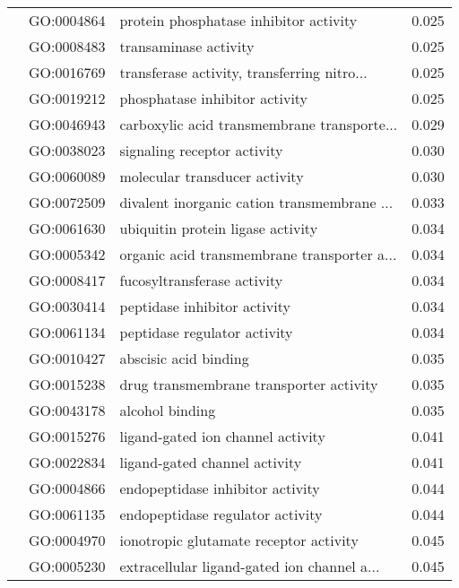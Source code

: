 \begin{longtable}{lllr}
   & GO:0004864 &       protein phosphatase inhibitor activity &         0.025 \\
   & GO:0008483 &                        transaminase activity &         0.025 \\
   & GO:0016769 &  transferase activity, transferring nitro... &         0.025 \\
   & GO:0019212 &               phosphatase inhibitor activity &         0.025 \\
   & GO:0046943 &  carboxylic acid transmembrane transporte... &         0.029 \\
   & GO:0038023 &                  signaling receptor activity &         0.030 \\
   & GO:0060089 &                molecular transducer activity &         0.030 \\
   & GO:0072509 &  divalent inorganic cation transmembrane ... &         0.033 \\
   & GO:0061630 &            ubiquitin protein ligase activity &         0.034 \\
   & GO:0005342 &  organic acid transmembrane transporter a... &         0.034 \\
   & GO:0008417 &                  fucosyltransferase activity &         0.034 \\
   & GO:0030414 &                 peptidase inhibitor activity &         0.034 \\
   & GO:0061134 &                 peptidase regulator activity &         0.034 \\
   & GO:0010427 &                        abscisic acid binding &         0.035 \\
   & GO:0015238 &      drug transmembrane transporter activity &         0.035 \\
   & GO:0043178 &                              alcohol binding &         0.035 \\
   & GO:0015276 &            ligand-gated ion channel activity &         0.041 \\
   & GO:0022834 &                ligand-gated channel activity &         0.041 \\
   & GO:0004866 &             endopeptidase inhibitor activity &         0.044 \\
   & GO:0061135 &             endopeptidase regulator activity &         0.044 \\
   & GO:0004970 &       ionotropic glutamate receptor activity &         0.045 \\
   & GO:0005230 &  extracellular ligand-gated ion channel a... &         0.045 \\

\end{longtable}
